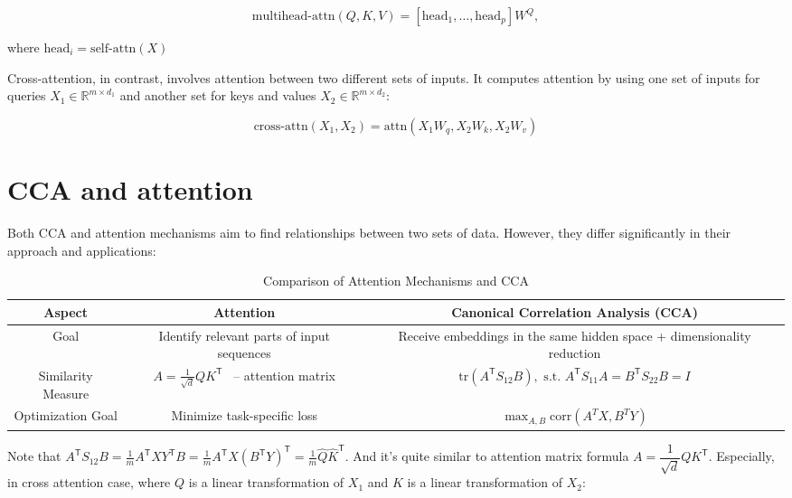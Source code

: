 \documentclass[a4paper,14pt]{article}
\newcommand{\dR}{\mathbb{R}}
\newcommand{\T}{^{\mathsf{T}}}
\theoremstyle{plain} %
\theoremstyle{definition} %
\theoremstyle{remark} %
\begin{document}
	\begin{equation}
		\text{multihead-attn}(Q, K, V) = [\text{head}_1, \ldots, \text{head}_p] W^Q,
		\label{multihead-attn}
	\end{equation}
	
	where $\text{head}_i = \text{self-attn}(X)$
	
	Cross-attention, in contrast, involves attention between two different sets of inputs. It computes attention by using one set of inputs for queries $X_1 \in \dR^{m \times d_1}$ and another set for keys and values $X_2 \in \dR^{m \times d_2}$:
	
	\begin{equation}
		\text{cross-attn}(X_1, X_2) = \text{attn}(X_1 W_q, X_2 W_k, X_2 W_v) \label{cross-attn}
	\end{equation}

        \section*{CCA and attention}
	
	Both CCA and attention mechanisms aim to find relationships between two sets of data. However, they differ significantly in their approach and applications:
	
	\setlength{\extrarowheight}{3mm}
	
	\begin{table}[bhtp]
		\centering
		\begin{tabulary}{\textwidth}{|C|C|C|}
			\hline
			\textbf{Aspect} & \textbf{Attention} & \textbf{Canonical Correlation Analysis (CCA)} \\ 
			\hline
			Goal & Identify relevant parts of input sequences & Receive embeddings in the same hidden space + dimensionality reduction \\
			\hline
			Similarity Measure & $A = \frac{1}{\sqrt{d}} Q K\T$ ~-- attention matrix & $\text{tr}(A\T S_{12} B), \text{ s.t. } A\T S_{11} A = B\T S_{22} B = I$ \\
			\hline
			Optimization Goal & Minimize task-specific loss & $\max_{A,B} \text{corr}(A^T X, B^T Y)$ \\
			\hline
		\end{tabulary}
		\caption{Comparison of Attention Mechanisms and CCA}
	\end{table}
	
	Note that $A\T S_{12} B = \frac{1}{m} A\T X Y\T B = \frac{1}{m} A\T X \left( B\T Y \right)\T = \frac{1}{m} \widehat{Q} \widehat{K}\T $. And it's quite similar to attention matrix formula $A = \dfrac{1}{\sqrt{d}} Q K\T$. Especially, in cross attention case, where $Q$ is a linear transformation of $X_1$ and $K$ is a linear transformation of $X_2$:
	
\end{document}
